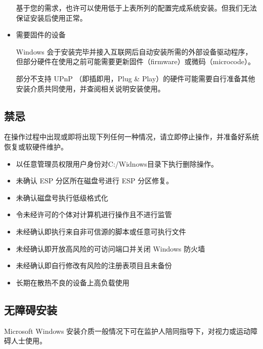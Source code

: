 \documentclass{article}
\begin{document}
\begin{multicols*}{3}
\begin{itemize}[leftmargin=*]
		基于您的需求，也许可以使用低于上表所列的配置完成系统安装。但我们无法保证安装后使用正常。

		\item 需要固件的设备

		Windows 会于安装完毕并接入互联网后自动安装所需的外部设备驱动程序，但部分硬件在使用之前可能需要更新固件（firmware）或微码（microcode）。

		部分不支持 UPnP （即插即用，Plug & Play）的硬件可能需要自行准备其他安装介质共同使用，并查阅相关说明安装使用。

	\end{itemize}


	\begin{tcolorbox}
	\section*{禁忌}
	\end{tcolorbox}

	在操作过程中出现或即将出现下列任何一种情况，请立即停止操作，并准备好系统恢复或软硬件维护。

	\begin{itemize}[leftmargin=*]
		\setlength{\itemsep}{0pt}
		\setlength{\parskip}{0pt}
		\setlength{\parsep}{0pt}

		\item 以任意管理员权限用户身份对C:/Widnows目录下执行删除操作。
		\item 未确认 ESP 分区所在磁盘号进行 ESP 分区修复。
		\item 未确认磁盘号执行低级格式化
		\item 令未经许可的个体对计算机进行操作且不进行监管
		\item 未经确认即执行来自非可信源的脚本或任意可执行文件
		\item 未经确认即开放高风险的可访问端口并关闭 Windows 防火墙
		\item 未经确认即自行修改有风险的注册表项目且未备份
		\item 长期在散热不良的设备上高负载使用
	\end{itemize}


	\begin{tcolorbox}
	\section*{无障碍安装}
	\end{tcolorbox}

	Microsoft Windows 安装介质一般情况下可在监护人陪同指导下，对视力或运动障碍人士使用。


\end{multicols*}
\end{document}
